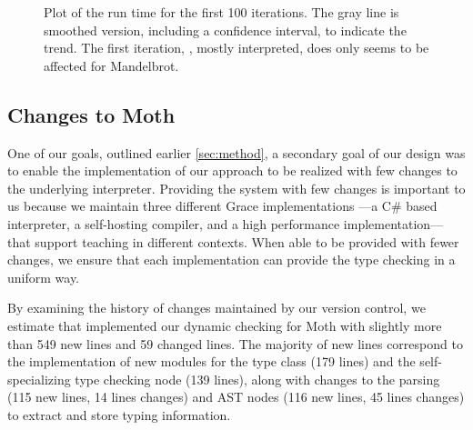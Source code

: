 \begin{figure}
	\TypingWarmup{}
	\caption{Plot of the run time for the first 100 iterations.
           The gray line is smoothed version, including a confidence interval,
           to indicate the trend.
           The first iteration, \ie, mostly interpreted, does only seems
           to be affected for Mandelbrot.}
	\label{fig:typing-warmup}
\end{figure}



%
%

\subsection{Changes to Moth}

One of our goals, outlined earlier \cref{sec:method}, a secondary
goal of our design was to enable the implementation of our approach to be
realized with few changes to the underlying interpreter. 
Providing the system with few changes is important to us because
we maintain three different Grace implementations%
---a C\# based interpreter, a self-hosting compiler, and a high performance implementation---%
that support teaching in different contexts.
When able to be provided with fewer changes, 
we ensure that each implementation can provide the type checking
in a uniform way.

By examining the history of changes maintained by our version control, 
we estimate that implemented our dynamic checking for Moth with
slightly more than 549 new lines and 59 changed lines. 
The majority of new lines correspond to the implementation of 
new modules for the type class (179 lines) and 
the self-specializing type checking node (139 lines),
along with changes to the parsing (115 new lines, 14 lines changes)
and AST nodes (116 new lines, 45 lines changes) to extract and store
typing information.



